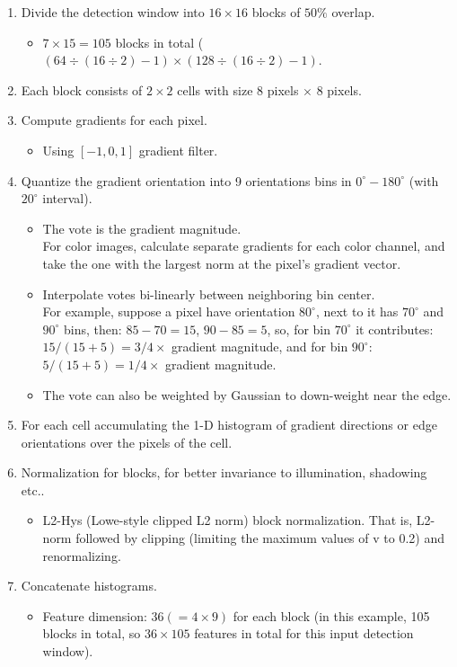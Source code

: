 \documentclass[12pt]{article}
\numberwithin{equation}{section}
\begin{document}
\begin{enumerate}
	\item Divide the detection window into $16 \times 16$ blocks of $50\%$ overlap.
		\begin{itemize}
			\item $7 \times 15 = 105$ blocks in total ($(64 \div (16 \div 2) - 1) \times 
				(128 \div (16 \div 2) - 1)$. 
		\end{itemize}
	\item Each block consists of $2 \times 2$ cells with size 8 pixels $ \times $ 8 pixels.
	\item Compute gradients for each pixel.
		\begin{itemize}
			\item Using $[-1, 0, 1]$ gradient filter.
		\end{itemize}
	\item Quantize the gradient orientation into 9 orientations bins in $0^\circ-180^\circ$
	(with $20^\circ$ interval).
		\begin{itemize}
			\item The vote is the gradient magnitude. \\
			For color images, calculate separate gradients for each color channel, and take the one with 
			the largest norm at the pixel's gradient vector.
			\item Interpolate votes bi-linearly between neighboring bin center. \\
			 For example, suppose a pixel have orientation $80^\circ$, next to it has $70^\circ$ and 
			 $90^\circ$ bins, then: $85-70=15$, $90-85=5$, so, for bin $70^\circ$ it contributes:
			  $15/(15+5)=3/4 \times$ gradient magnitude, and for bin $90^\circ$: $5/(15+5)=1/4 \times$
			  gradient magnitude.
			\item The vote can also be weighted by Gaussian to down-weight near the edge.
		\end{itemize}
	\item For each cell accumulating the 1-D histogram of gradient directions or edge orientations over
	the pixels of the cell.
	\item Normalization for blocks, for better invariance to illumination, shadowing etc..
		\begin{itemize}
			\item L2-Hys (Lowe-style clipped L2 norm) block normalization. That is, L2-norm followed by 
			clipping (limiting the maximum values of v to 0.2) and renormalizing.
		\end{itemize}		
	\item Concatenate histograms.
		\begin{itemize}
			\item Feature dimension: $36(=4 \times 9)$ for each block (in this example, 105 blocks in total,
			so $36 \times 105$ features in total for this input detection window).
		\end{itemize}	
\end{enumerate}
\end{document}
